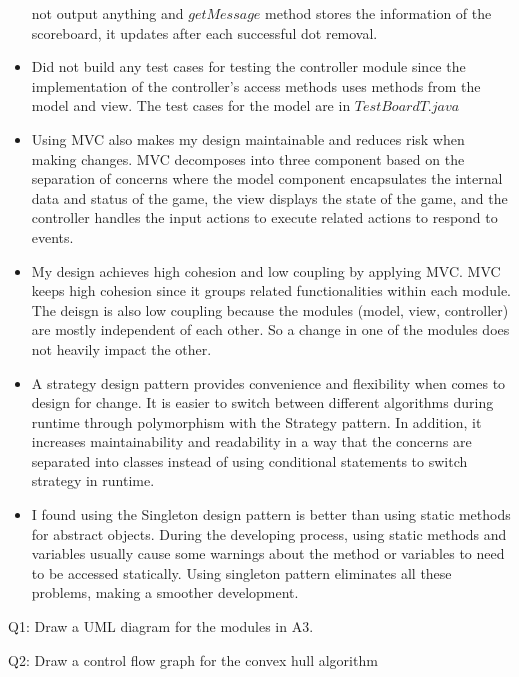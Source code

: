 \documentclass[12pt]{article}
\begin{document}
\begin{itemize}
        not output anything and $getMessage$ method stores the information of the scoreboard, it updates after each successful dot removal.
  \item Did not build any test cases for testing the controller module since the implementation of the controller's access methods uses 
        methods from the model and view. The test cases for the model are in $TestBoardT.java$
  \item Using MVC also makes my design maintainable and reduces risk when making changes. MVC decomposes into three 
        component based on the separation of concerns where the model component encapsulates the internal 
        data and status of the game, the view displays the state of the game, and the controller handles
        the input actions to execute related actions to respond to events.
  \item My design achieves high cohesion and low coupling by applying MVC. MVC keeps high cohesion since
        it groups related functionalities within each module. The deisgn is also low coupling because
        the modules (model, view, controller) are mostly independent of each other. So a change in one of the
        modules does not heavily impact the other.
  \item A strategy design pattern provides convenience and flexibility when comes to design for change. It is easier to switch
        between different algorithms during runtime through polymorphism with the Strategy pattern. In addition, it increases
        maintainability and readability in a way that the concerns are separated into classes instead of using
        conditional statements to switch strategy in runtime.
  \item I found using the Singleton design pattern is better than using static methods for abstract objects. During the developing process, using 
        static methods and variables usually cause some warnings about the method or variables to need to be accessed statically. Using singleton
        pattern eliminates all these problems, making a smoother development.
  
\end{itemize}

\noindent Q1: Draw a UML diagram for the modules in A3.

\noindent Q2: Draw a control flow graph for the convex hull algorithm

%
\end{document}

